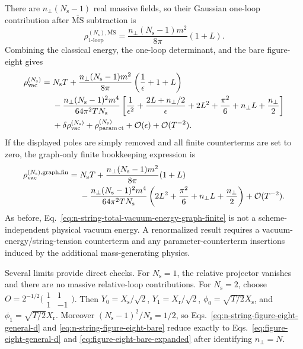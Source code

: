 There are $n_\perp(N_{\mathrm s}-1)$ real massive fields, so their Gaussian
one-loop contribution after $\overline{\mathrm{MS}}$ subtraction is
\begin{equation}
  \boxed{
  \rho_{1\text{-loop}}^{(N_{\mathrm s}),\overline{\mathrm{MS}}}
  =\frac{n_\perp(N_{\mathrm s}-1)m^2}{8\pi}(1+L) }.
  \label{eq:n-string-gaussian-one-loop}
\end{equation}
Combining the classical energy, the one-loop determinant, and the bare
figure-eight gives
\begin{align}
  \rho_{\mathrm{vac}}^{(N_{\mathrm s})}
  ={}&N_{\mathrm s}T
  +\frac{n_\perp(N_{\mathrm s}-1)m^2}{8\pi}
    \left(\frac{1}{\epsilon}+1+L\right)
  \notag\\
  &-\frac{n_\perp(N_{\mathrm s}-1)^2m^4}
          {64\pi^2TN_{\mathrm s}}
   \left[
    \frac{1}{\epsilon^2}
    +\frac{2L+n_\perp/2}{\epsilon}
    +2L^2+\frac{\pi^2}{6}
    +n_\perp L+\frac{n_\perp}{2}
   \right]
  \notag\\
  &+\delta\rho_{\mathrm{vac}}^{(N_{\mathrm s})}
   +\rho_{\mathrm{param\,ct}}^{(N_{\mathrm s})}
   +\mathcal O(\epsilon)+\mathcal O(T^{-2}).
  \label{eq:n-string-total-vacuum-energy-bare}
\end{align}
If the displayed poles are simply removed and all finite counterterms are set
to zero, the graph-only finite bookkeeping expression is
\begin{align}
  \rho_{\mathrm{vac}}^{(N_{\mathrm s}),\mathrm{graph,fin}}
  ={}&N_{\mathrm s}T
  +\frac{n_\perp(N_{\mathrm s}-1)m^2}{8\pi}(1+L)
  \notag\\
  &-\frac{n_\perp(N_{\mathrm s}-1)^2m^4}
          {64\pi^2TN_{\mathrm s}}
   \left(2L^2+\frac{\pi^2}{6}
         +n_\perp L+\frac{n_\perp}{2}\right)
  +\mathcal O(T^{-2}).
  \label{eq:n-string-total-vacuum-energy-graph-finite}
\end{align}
As before, Eq.~\eqref{eq:n-string-total-vacuum-energy-graph-finite} is not a
scheme-independent physical vacuum energy.  A renormalized result requires a
vacuum-energy/string-tension counterterm and any parameter-counterterm
insertions induced by the additional mass-generating physics.

Several limits provide direct checks.  For $N_{\mathrm s}=1$, the relative
projector vanishes and there are no massive relative-loop contributions.  For
$N_{\mathrm s}=2$, choose
$O=2^{-1/2}\bigl(\begin{smallmatrix}1&1\\1&-1\end{smallmatrix}\bigr)$.
Then $Y_0=X_{\mathrm s}/\sqrt2$, $Y_1=X_{\mathrm r}/\sqrt2$,
$\phi_0=\sqrt{T/2}X_{\mathrm s}$, and
$\phi_1=\sqrt{T/2}X_{\mathrm r}$.  Moreover
$(N_{\mathrm s}-1)^2/N_{\mathrm s}=1/2$, so
Eqs.~\eqref{eq:n-string-figure-eight-general-d} and
\eqref{eq:n-string-figure-eight-bare} reduce exactly to
Eqs.~\eqref{eq:figure-eight-general-d} and
\eqref{eq:figure-eight-bare-expanded} after identifying
$n_\perp=N$.
